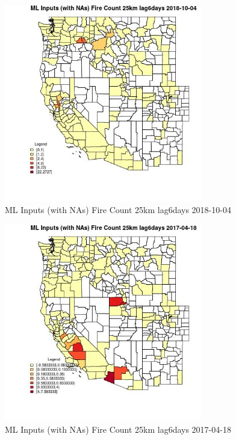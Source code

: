 \begin{figure} 
\centering  
\includegraphics[width=0.77\textwidth]{Code_Outputs/Report_ML_input_PM25_Step4_part_f_de_duplicated_aveswNAs_CountyFire_Count_25km_lag6daysMean2018-10-04.jpg} 
\caption{\label{fig:Report_ML_input_PM25_Step4_part_f_de_duplicated_aveswNAsCountyFire_Count_25km_lag6daysMean2018-10-04}ML Inputs (with NAs) Fire Count 25km lag6days 2018-10-04} 
\end{figure} 
 

\begin{figure} 
\centering  
\includegraphics[width=0.77\textwidth]{Code_Outputs/Report_ML_input_PM25_Step4_part_f_de_duplicated_aveswNAs_CountyFire_Count_25km_lag6daysMean2017-04-18.jpg} 
\caption{\label{fig:Report_ML_input_PM25_Step4_part_f_de_duplicated_aveswNAsCountyFire_Count_25km_lag6daysMean2017-04-18}ML Inputs (with NAs) Fire Count 25km lag6days 2017-04-18} 
\end{figure} 
 

